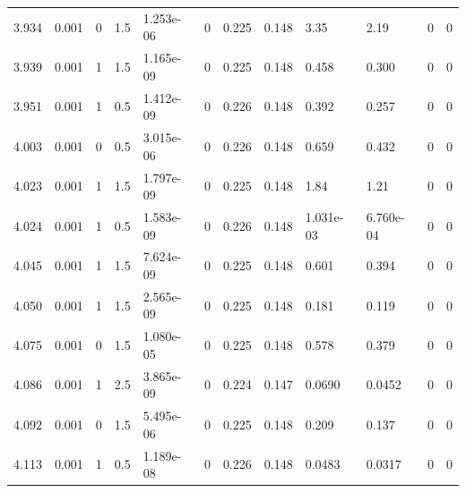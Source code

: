 \documentclass[preview]{standalone}
\begin{document}
{{{\begin{tabular}{L{1.2cm}C{1.2cm} C{0.3cm}C{0.5cm} C{1.4cm}C{1.4cm} C{1.4cm}C{1.4cm} C{1.6cm}C{1.6cm} C{1.6cm}C{1.6cm}}
  3.934  &  0.001  & 0     & 1.5 &  1.253e-06  & 0  &  0.225&   0.148& 3.35 & 2.19   &  0 & 0  \\ 
  3.939  &  0.001  & 1     & 1.5 &  1.165e-09  & 0  &  0.225&   0.148& 0.458 & 0.300   &  0 & 0  \\ 
  3.951  &  0.001  & 1     & 0.5 &  1.412e-09  & 0  &  0.226&   0.148& 0.392 & 0.257   &  0 & 0  \\ 
  4.003  &  0.001  & 0     & 0.5 &  3.015e-06  & 0  &  0.226&   0.148& 0.659 & 0.432   &  0 & 0  \\ 
  4.023  &  0.001  & 1     & 1.5 &  1.797e-09  & 0  &  0.225&   0.148& 1.84 & 1.21   &  0 & 0  \\ 
  4.024  &  0.001  & 1     & 0.5 &  1.583e-09  & 0  &  0.226&   0.148& 1.031e-03 & 6.760e-04   &  0 & 0  \\ 
  4.045  &  0.001  & 1     & 1.5 &  7.624e-09  & 0  &  0.225&   0.148& 0.601 & 0.394   &  0 & 0  \\ 
  4.050  &  0.001  & 1     & 1.5 &  2.565e-09  & 0  &  0.225&   0.148& 0.181 & 0.119   &  0 & 0  \\ 
  4.075  &  0.001  & 0     & 1.5 &  1.080e-05  & 0  &  0.225&   0.148& 0.578 & 0.379   &  0 & 0  \\ 
  4.086  &  0.001  & 1     & 2.5 &  3.865e-09  & 0  &  0.224&   0.147& 0.0690 & 0.0452   &  0 & 0  \\ 
  4.092  &  0.001  & 0     & 1.5 &  5.495e-06  & 0  &  0.225&   0.148& 0.209 & 0.137   &  0 & 0  \\ 
  4.113  &  0.001  & 1     & 0.5 &  1.189e-08  & 0  &  0.226&   0.148& 0.0483 & 0.0317   &  0 & 0  \\ 
\hline 
\end{tabular} 

}}}
\end{document}
